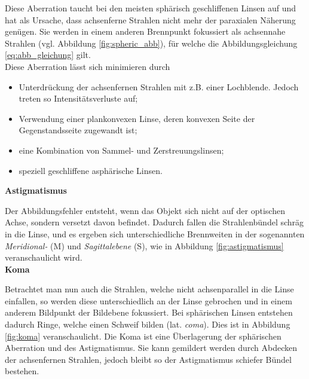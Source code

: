 Diese Aberration taucht bei den meisten sphärisch geschliffenen Linsen auf und hat als Ursache, dass achsenferne Strahlen nicht mehr der paraxialen Näherung genügen. Sie werden in einem anderen Brennpunkt fokussiert als achsennahe Strahlen (vgl. Abbildung \ref{fig:spheric_abb}), für welche die Abbildungsgleichung \eqref{eq:abb_gleichung} gilt.\\
Diese Aberration lässt sich minimieren durch
\begin{itemize}
	\item Unterdrückung der achsenfernen Strahlen mit z.B. einer Lochblende. Jedoch treten so Intensitätsverluste auf;
	\item Verwendung einer plankonvexen Linse, deren konvexen Seite der Gegenstandsseite zugewandt ist;
	\item eine Kombination von Sammel- und Zerstreuungslinsen;
	\item speziell geschliffene asphärische Linsen.
\end{itemize}


\textbf{Astigmatismus}

Der Abbildungsfehler entsteht, wenn das Objekt sich nicht auf der optischen Achse, sondern versetzt davon befindet. Dadurch fallen die Strahlenbündel schräg in die Linse, und es ergeben sich unterschiedliche Brennweiten in der sogenannten \emph{Meridional-} (M) und \emph{Sagittalebene} (S), wie in Abbildung \ref{fig:astigmatismus} veranschaulicht wird.\\

\textbf{Koma}

Betrachtet man nun auch die Strahlen, welche nicht achsenparallel in die Linse einfallen, so werden diese unterschiedlich an der Linse gebrochen und in einem anderem Bildpunkt der Bildebene fokussiert. Bei sphärischen Linsen entstehen dadurch Ringe, welche einen Schweif bilden (lat. \emph{coma}). Dies ist in Abbildung \ref{fig:koma} veranschaulicht. Die Koma ist eine Überlagerung der sphärischen Aberration und des Astigmatismus.
Sie kann gemildert werden durch Abdecken der achsenfernen Strahlen, jedoch bleibt so der Astigmatismus schiefer Bündel bestehen.

